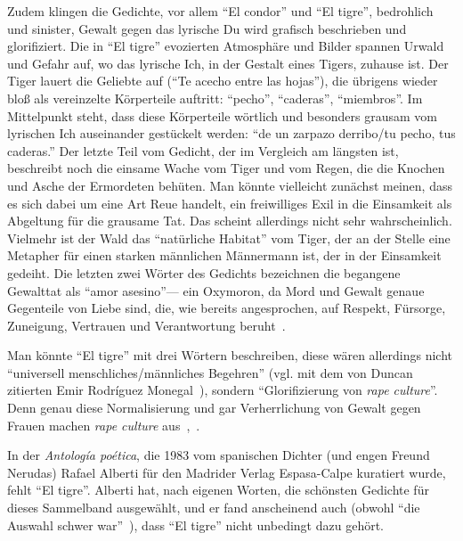 Zudem klingen die Gedichte, vor allem ``El condor'' und ``El tigre'', bedrohlich und sinister, Gewalt gegen das lyrische Du wird grafisch beschrieben und glorifiziert.
Die in ``El tigre'' evozierten Atmosphäre und Bilder spannen Urwald und Gefahr auf, wo das lyrische Ich, in der Gestalt eines Tigers, zuhause ist.
Der Tiger lauert die Geliebte auf (``Te acecho entre las hojas''), die übrigens wieder bloß als vereinzelte Körperteile auftritt: ``pecho'', ``caderas'', ``miembros''.
Im Mittelpunkt steht, dass diese Körperteile wörtlich und besonders grausam vom lyrischen Ich auseinander gestückelt werden:
``de un zarpazo derribo/tu pecho, tus caderas.''
Der letzte Teil vom Gedicht, der im Vergleich am längsten ist, beschreibt noch die einsame Wache vom Tiger und vom Regen, die die Knochen und Asche der Ermordeten behüten.
Man könnte vielleicht zunächst meinen, dass es sich dabei um eine Art Reue handelt, ein freiwilliges Exil in die Einsamkeit als Abgeltung für die grausame Tat.
Das scheint allerdings nicht sehr wahrscheinlich.
Vielmehr ist der Wald das ``natürliche Habitat'' vom Tiger, der an der Stelle eine Metapher für einen starken männlichen Männermann ist, der in der Einsamkeit gedeiht.
Die letzten zwei Wörter des Gedichts bezeichnen die begangene Gewalttat als ``amor asesino''—
ein Oxymoron, da Mord und Gewalt genaue Gegenteile von Liebe sind, die, wie bereits angesprochen, auf Respekt, Fürsorge, Zuneigung, Vertrauen und Verantwortung beruht~\cite{hooks2001}.

Man könnte ``El tigre'' mit drei Wörtern beschreiben, diese wären allerdings nicht ``universell menschliches/männliches Begehren'' (vgl. mit dem von Duncan zitierten Emir Rodríguez Monegal~\cite{Duncan1992}), sondern ``Glorifizierung von \textit{rape culture}''.
Denn genau diese Normalisierung und gar Verherrlichung von Gewalt gegen Frauen machen \textit{rape culture} aus~\cite[S.143-151]{Penny2014},~\cite{Johnson2021}.

\begin{comment}
Rape ist nicht Liebe oder Desire; Es geht um Macht;
Und genau durch solche Aussagen, die solche Vorstellungen normalisieren, anstatt sie als Gewalt zu diffamieren, wird diese weiter aufrechterhalten.
\end{comment}

In der \textit{Antología poética}, die 1983 vom spanischen Dichter (und engen Freund Nerudas) Rafael Alberti für den Madrider Verlag Espasa-Calpe kuratiert wurde, fehlt ``El tigre''.
Alberti hat, nach eigenen Worten, die schönsten Gedichte für dieses Sammelband ausgewählt, und er fand anscheinend auch (obwohl ``die Auswahl schwer war''~\cite{Alberti1983}), dass ``El tigre'' nicht unbedingt dazu gehört.


